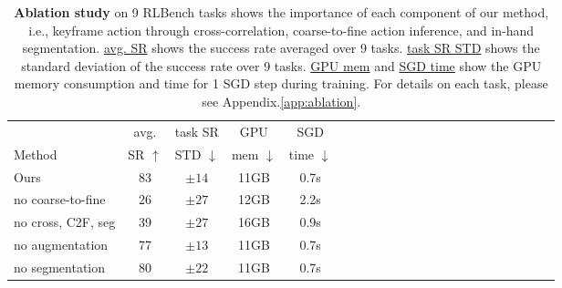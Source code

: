 
\begin{table}
\centering
\scriptsize
\begin{tabular}{lccccccccccccccccccccc}
\toprule
                    & avg.          & task SR      & GPU              & SGD                \\
Method              & SR $\uparrow$ &STD $\downarrow$& mem $\downarrow$ & time $\downarrow$ \\ \midrule

Ours                & 83            & $\pm14$         & 11GB              & 0.7s              \\
no coarse-to-fine \footnotemark &26 & $\pm27$         & 12GB              & 2.2s              \\
no cross, C2F, seg  & 39            & $\pm27$         & 16GB              & 0.9s              \\
no augmentation     & 77            & $\pm13$         & 11GB              & 0.7s              \\
no segmentation     & 80            & $\pm22$         & 11GB              & 0.7s              \\
\bottomrule
\end{tabular}
\caption{\textbf{Ablation study} on 9 RLBench tasks shows the importance of each component of our method, i.e., keyframe action through cross-correlation, coarse-to-fine action inference, and in-hand segmentation. \underline{avg. SR} shows the success rate averaged over 9 tasks. \underline{task SR STD} shows the standard deviation of the success rate over 9 tasks. \underline{GPU mem} and \underline{SGD time} show the GPU memory consumption and time for 1 SGD step during training. For details on each task, please see Appendix.\ref{app:ablation}.}

\label{table:ablation}
\end{table}
